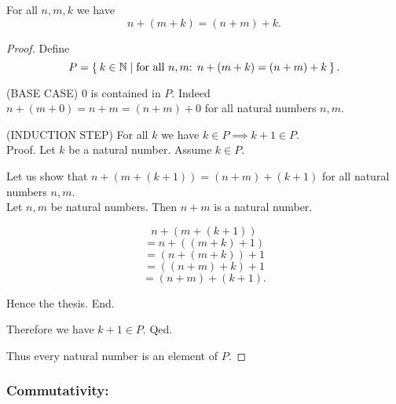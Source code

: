 \documentclass[../../arithmetic.ftl.tex]{subfiles}
\begin{document}
  \begin{forthel}
    \begin{proposition}\label{Arithmetic_01_02_468785}
      For all $n,m,k$ we have \[ n + (m + k) = (n + m) + k. \]
    \end{proposition}
    \begin{proof}
      Define \[ P = \Set{ k \in \mathbb{N} | \text{for all $n,m$: $n + (m + k) = (n + m) + k$}}. \]

      (BASE CASE) $0$ is contained in $P$.
      Indeed $n + (m + 0) = n + m = (n + m) + 0$ for all natural numbers $n,m$.

      (INDUCTION STEP) For all $k$ we have $k \in P \implies k + 1 \in P$. \\
      Proof.
        Let $k$ be a natural number.
         Assume $k \in P$.

        Let us show that $n + (m + (k + 1)) = (n + m) + (k + 1)$ for all natural numbers $n,m$. \\
          Let $n,m$ be natural numbers.
          Then $n + m$ is a natural number.

          \[   n + (m + (k + 1)) \]
          \[ = n + ((m + k) + 1) \]  %
          \[ = (n + (m + k)) + 1 \]  %
          \[ = ((n + m) + k) + 1 \]  %
          \[ = (n + m) + (k + 1). \] %

          Hence the thesis.
        End.

        Therefore we have $k + 1 \in P$.
      Qed.

      Thus every natural number is an element of $P$.
    \end{proof}
  \end{forthel}


  \subsubsection*{Commutativity:}
\end{document}
